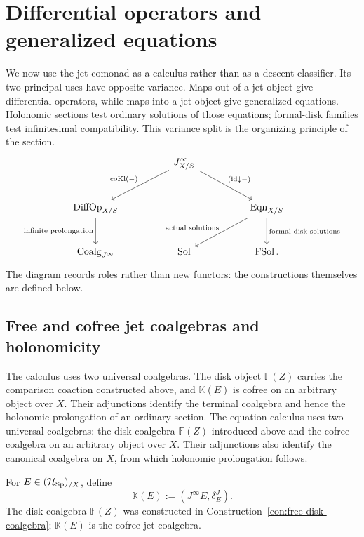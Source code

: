 \section{Differential operators and generalized equations}
\label{sec:jets-operators-equations}

We now use the jet comonad as a calculus rather than as a descent classifier.
Its two principal uses have opposite variance. Maps out of a jet object give
differential operators, while maps into a jet object give generalized
equations. Holonomic sections test ordinary solutions of those equations;
formal-disk families test infinitesimal compatibility. This variance split is
the organizing principle of the section.
\[
\begin{tikzcd}[column sep=huge,row sep=large]
&
J^\infty_{X/S}
  \ar[dl,"{\operatorname{coKl}(-)}"']
  \ar[dr,"{(\id\downarrow -)}"]
&
\\
\operatorname{DiffOp}_{X/S}
  \ar[d,"{\text{infinite prolongation}}"']
&&
\operatorname{Eqn}_{X/S}
  \ar[dl,"{\text{actual solutions}}"']
  \ar[d,"{\text{formal-disk solutions}}"]
\\
\operatorname{Coalg}_{J^\infty}
&
\operatorname{Sol}
&
\operatorname{FSol}.
\end{tikzcd}
\]
The diagram records roles rather than new functors: the constructions
themselves are defined below.
\subsection{Free and cofree jet coalgebras and holonomicity}
\label{sec:free-cofree-jets}
The calculus uses two universal coalgebras. The disk object
\(\mathbb F(Z)\) carries the comparison coaction constructed above, and
\(\mathbb K(E)\) is cofree on an arbitrary object over \(X\). Their adjunctions
identify the terminal coalgebra and hence the holonomic prolongation of an
ordinary section.
The equation calculus uses two universal coalgebras: the disk coalgebra \(\mathbb F(Z)\) introduced above and the cofree coalgebra on an arbitrary object over \(X\). Their adjunctions also identify the canonical coalgebra on \(X\), from which holonomic prolongation follows.

\begin{construction}
For \(E\in(\mathcal H_{\operatorname{Sp}})_{/X}\), define
\[
  \mathbb K(E):=(J^\infty E,\delta^J_E).
\]
The disk coalgebra \(\mathbb F(Z)\) was constructed in
Construction~\ref{con:free-disk-coalgebra}; \(\mathbb K(E)\) is the cofree jet coalgebra.
\end{construction}

